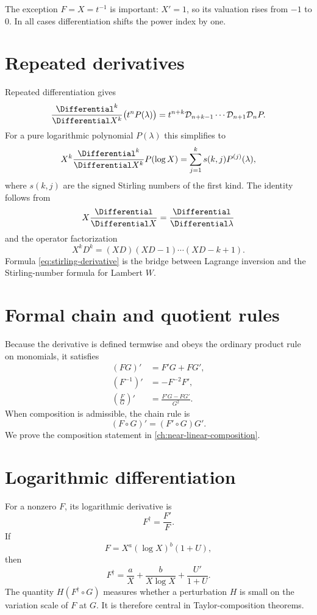 \documentclass[11pt,openany]{book}
\theoremstyle{definition}
\theoremstyle{plain}
\theoremstyle{remark}
\begin{document}
The exception \(F=X=t^{-1}\) is important: \(X'=1\), so its valuation rises from \(-1\) to \(0\). In all cases differentiation shifts the power index by one.

\section{Repeated derivatives}
Repeated differentiation gives
\begin{equation}\label{eq:repeated-derivative-block}
 \frac{\Differential^k}{\Differential X^k}\bigl(t^nP(\lambda)\bigr)
 =t^{n+k}
 \mathcal D_{n+k-1}\cdots\mathcal D_{n+1}\mathcal D_nP.
\end{equation}
For a pure logarithmic polynomial \(P(\lambda)\) this simplifies to
\begin{equation}\label{eq:stirling-derivative}
 X^k\frac{\Differential^k}{\Differential X^k}P(\log X)
 =\sum_{j=1}^{k}s(k,j)P^{(j)}(\lambda),
\end{equation}
where \(s(k,j)\) are the signed Stirling numbers of the first kind. The identity follows from
\[
 X\frac{\Differential}{\Differential X}=\frac{\Differential}{\Differential\lambda}
\]
and the operator factorization
\[
 X^kD^k=(XD)(XD-1)\cdots(XD-k+1).
\]
Formula \cref{eq:stirling-derivative} is the bridge between Lagrange inversion and the Stirling-number formula for Lambert \(W\).

\section{Formal chain and quotient rules}
Because the derivative is defined termwise and obeys the ordinary product rule on monomials, it satisfies
\begin{align*}
 (FG)'&=F'G+FG',\\
 (F^{-1})'&=-F^{-2}F',\\
 \left(\frac FG\right)'&=\frac{F'G-FG'}{G^2}.
\end{align*}
When composition is admissible, the chain rule is
\begin{equation}\label{eq:chain-rule-preview}
 (F\circ G)'=(F'\circ G)G'.
\end{equation}
We prove the composition statement in \cref{ch:near-linear-composition}.

\section{Logarithmic differentiation}
For a nonzero \(F\), its logarithmic derivative is
\[
 F^\dagger=\frac{F'}F.
\]
If
\[
 F=X^a(\log X)^b(1+U),
\]
then
\begin{equation}\label{eq:logarithmic-derivative}
 F^\dagger=\frac aX+\frac b{X\log X}+\frac{U'}{1+U}.
\end{equation}
The quantity \(H(F^\dagger\circ G)\) measures whether a perturbation \(H\) is small on the variation scale of \(F\) at \(G\). It is therefore central in Taylor-composition theorems.
\end{document}
